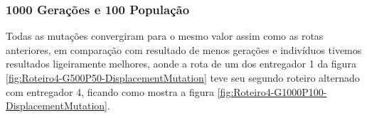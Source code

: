 \begin{center}
	\label{fig:Roteiro4-G500P50-SwapMutation}
\end{center}

\subsubsection{1000 Gerações e 100 População}

Todas as mutações convergiram para o mesmo valor assim como as rotas anteriores, em comparação com resultado de menos gerações e indivíduos tivemos resultados ligeiramente melhores, aonde a rota de um dos entregador 1 da figura \ref{fig:Roteiro4-G500P50-DisplacementMutation} teve seu segundo roteiro alternado com entregador 4, ficando como mostra a figura \ref{fig:Roteiro4-G1000P100-DisplacementMutation}.


